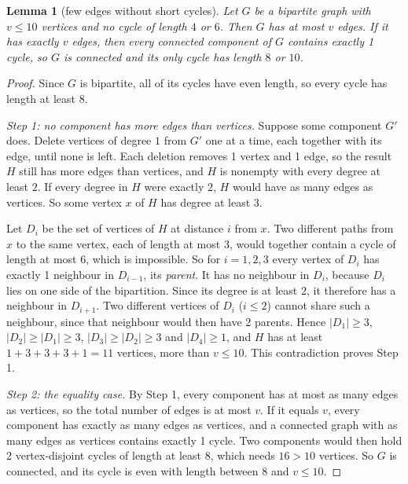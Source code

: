 \documentclass[12pt]{article}
\newtheorem{lemma}{Lemma}
\theoremstyle{definition}\newtheorem{definition}{Definition}
\theoremstyle{remark}\newtheorem{remark}{Remark}
\begin{document}
\begin{lemma}[few edges without short cycles]\label{lem:tenvertices}
Let $G$ be a bipartite graph with $v\le 10$ vertices and no cycle of length $4$
or $6$. Then $G$ has at most $v$ edges. If it has exactly $v$ edges, then every
connected component of $G$ contains exactly 1 cycle, so $G$ is connected and its
only cycle has length $8$ or $10$.
\end{lemma}
\begin{proof}
Since $G$ is bipartite, all of its cycles have even length, so every cycle has
length at least $8$.

\emph{Step 1: no component has more edges than vertices.} Suppose some
component $G'$ does. Delete vertices of degree $1$ from $G'$ one at a time,
each together with its edge, until none is left. Each deletion removes 1 vertex
and 1 edge, so the result $H$ still has more edges than vertices, and $H$ is
nonempty with every degree at least $2$. If every degree in $H$ were exactly
$2$, $H$ would have as many edges as vertices. So some vertex $x$ of $H$ has
degree at least $3$.

Let $D_i$ be the set of vertices of $H$ at distance $i$ from $x$. Two
different paths from $x$ to the same vertex, each of length at most $3$, would
together contain a cycle of length at most $6$, which is impossible. So for
$i=1,2,3$ every vertex of $D_i$ has exactly 1 neighbour in $D_{i-1}$, its
\emph{parent}. It has no neighbour in $D_i$, because $D_i$ lies on one side of
the bipartition. Since its degree is at least $2$, it therefore has a
neighbour in $D_{i+1}$. Two different vertices of $D_i$ ($i\le2$) cannot share
such a neighbour, since that neighbour would then have 2 parents. Hence
$|D_1|\ge3$, $|D_2|\ge|D_1|\ge3$, $|D_3|\ge|D_2|\ge3$ and $|D_4|\ge1$, and $H$
has at least $1+3+3+3+1=11$ vertices, more than $v\le10$. This
contradiction proves Step 1.

\emph{Step 2: the equality case.} By Step 1, every component has at most as
many edges as vertices, so the total number of edges is at most $v$. If it
equals $v$, every component has exactly as many edges as vertices, and a
connected graph with as many edges as vertices contains exactly 1 cycle. Two
components would then hold 2 vertex-disjoint cycles of length at least $8$,
which needs $16>10$ vertices. So $G$ is connected, and its cycle is even with
length between $8$ and $v\le10$.
\end{proof}
\end{document}
